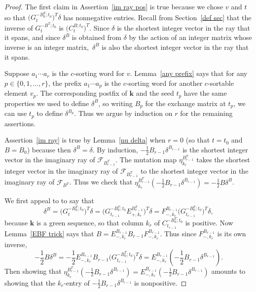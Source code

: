 \documentclass{amsart}
\theoremstyle{definition}
\theoremstyle{remark}
\numberwithin{equation}{section}
\newcommand{\set}[1]{{\lbrace #1 \rbrace}}
\newcommand{\F}{{\mathcal F}}
\newcommand{\0}{{\mathbf{0}}}
\newcommand{\kk}{{\boldsymbol{k}}}
\begin{document}
\begin{proof}%
  The first claim in Assertion~\ref{im ray pos} is true because we chose $v$ and $t$ so that $\bigl(G_t^{-B_0^T;t_0}\bigr)^T\delta$ has nonnegative entries.
Recall from Section~\ref{def sec} that the inverse of $G_t^{-B^T;t_0}$ is $\bigl(C_t^{B;t_0}\bigr)^T$.
Since $\delta$ is the shortest integer vector in the ray that it spans, and since $\delta^B$ is obtained from $\delta$ by the action of an integer matrix whose inverse is an integer matrix,~$\delta^B$ is also the shortest integer vector in the ray that it spans.

Suppose $a_1\cdots a_r$ is the $c$-sorting word for $v$.
Lemma~\ref{any prefix} says that for any ${p\in\set{0,1,\ldots,r}}$, the prefix $a_1\cdots a_p$ is the $c$-sorting word for another $c$-sortable element $v_p$.
The corresponding postfix of $\kk$ and the seed $t_p$ have the same properties we used to define $\delta^B$, so writing $B_p$ for the exchange matrix at $t_p$, we can use $t_p$ to define $\delta^{B_p}$.
Thus we argue by induction on $r$ for the remaining assertions.

Assertion~\ref{im ray} is true by Lemma~\ref{nu delta} when $r=0$ (so that $t=t_0$ and $B=B_0$) because then $\delta^B=\delta$.
By induction, $-\frac12B_{r-1}\delta^{B_{r-1}}$ is the shortest integer vector in the imaginary ray of $\F_{B_{r-1}^T}$.
The mutation map $\eta_{k_r}^{B_{r-1}^T}$ takes the shortest integer vector in the imaginary ray of $\F_{B_{r-1}^T}$ to the shortest integer vector in the imaginary ray of $\F_{B^T}$. 
Thus we check that $\eta_{k_r}^{B_{r-1}^T}(-\frac12B_{r-1}\delta^{B_{r-1}})=-\frac12B\delta^{B}$.

We first appeal to \cite[Proposition~1.3]{NZ} to say that 
\[\delta^B=\bigl(G_t^{-B_0^T;t_0}\bigr)^T\delta=\bigl(G_{t_{r-1}}^{-B_0^T;t_0}E_{+,k_r}^{B_{r-1}^T}\bigr)^T\delta=F_{-,k_r}^{B_{r-1}}\bigl(G_{t_{r-1}}^{-B_0^T;t_0}\bigr)^T\delta,\]
because $\kk$ is a green sequence, so that column $k_r$ of $C_{t_{r-1}}^{-B_0^T;t_0}$ is positive.
Now Lemma~\ref{EBF trick} says that $B=E_{-,k_r}^{B_{r-1}}B_{r-1}F_{-,k_r}^{B_{r-1}}$.
Thus since $F_{-,k_r}^{B_{r-1}}$ is its own inverse, 
\[-\frac12B\delta^B=-\frac12E_{-,k_r}^{B_{r-1}}B_{r-1}\bigl(G_{t_{r-1}}^{-B_0^T;t_0}\bigr)^T\delta=E_{-,k_r}^{B_{r-1}}(-\frac12B_{r-1}\delta^{B_{r-1}}).\]
Then showing that $\eta_{k_r}^{B_{r-1}^T}(-\frac12B_{r-1}\delta^{B_{r-1}})=E_{-,k_r}^{B_{r-1}}(-\frac12B_{r-1}\delta^{B_{r-1}})$ amounts to showing that the $k_r$-entry of $-\frac12B_{r-1}\delta^{B_{r-1}}$ is nonpositive.


\end{proof}
\end{document}
